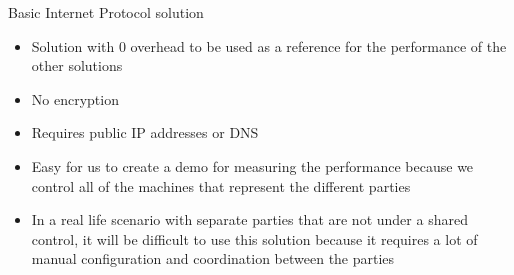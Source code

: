 \hypertarget{notes__02040-basic-ip.md}{}
\begin{block}{Basic Internet Protocol solution}
\protect\hypertarget{notes__02040-basic-ip.md__basic-internet-protocol-solution}{}
\begin{itemize}
\tightlist
\item
  Solution with 0 overhead to be used as a reference for the performance
  of the other solutions
\item
  No encryption
\item
  Requires public IP addresses or DNS
\item
  Easy for us to create a demo for measuring the performance because we
  control all of the machines that represent the different parties
\item
  In a real life scenario with separate parties that are not under a
  shared control, it will be difficult to use this solution because it
  requires a lot of manual configuration and coordination between the
  parties
\end{itemize}
\end{block}

